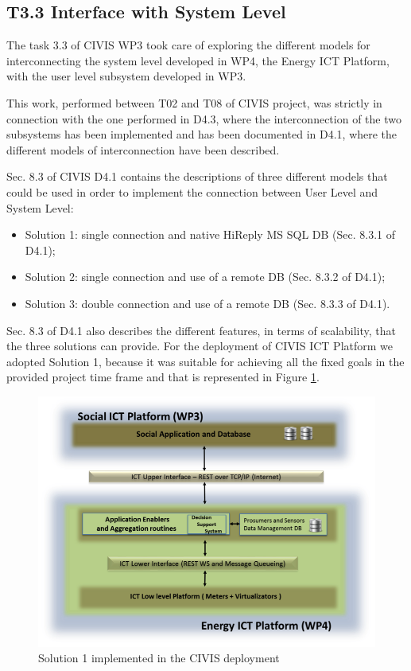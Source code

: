 \subsection{T3.3 Interface with System Level}

The task 3.3 of CIVIS WP3 took care of exploring the different models for interconnecting the system level developed in WP4, the Energy ICT Platform, with the user level subsystem developed in WP3.

This work, performed between T02 and T08 of CIVIS project, was strictly in connection with the one performed in D4.3, where the interconnection of the two subsystems has been implemented and has been documented in D4.1, where the different models of interconnection have been described.

Sec. 8.3 of CIVIS D4.1 contains the descriptions of three different models that could be used in order to implement the connection between User Level and System Level:

\begin{itemize}
\item Solution 1: single connection and native HiReply MS SQL DB (Sec. 8.3.1 of D4.1);
\item Solution 2: single connection and use of a remote DB (Sec. 8.3.2 of D4.1);
\item Solution 3: double connection and use of a remote DB (Sec. 8.3.3 of D4.1).
\end{itemize}

Sec. 8.3 of D4.1 also describes the different features, in terms of scalability, that the three solutions can provide. For the deployment of CIVIS ICT Platform we adopted Solution 1, because it was suitable for achieving all the fixed goals in the provided project time frame and that is represented in Figure \ref{fig:wp4}.

\begin{figure}[h!]
\begin{center}
	\includegraphics[width=.85\textwidth]{img/wp4.png}
	\caption{Solution 1 implemented in the CIVIS deployment}\label{fig:wp4}
\end{center}
\end{figure}

